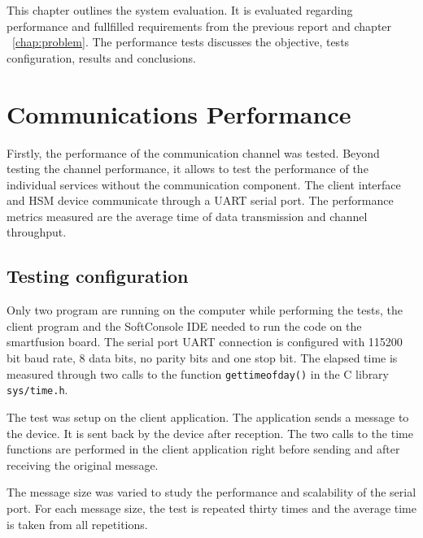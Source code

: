\cleardoublepage
\label{chap:evaluation}

This chapter outlines the system evaluation. It is evaluated regarding performance and fullfilled requirements from the previous report and chapter ~\ref{chap:problem}.
The performance tests discusses the objective, tests configuration, results and conclusions.
\section{Communications Performance}\label{chap:evaluation:comms}

Firstly, the performance of the communication channel was tested. Beyond testing the channel performance, it allows to test the performance of the individual services without the communication component. 
The client interface and HSM device communicate through a \ac{UART} serial port.
The performance metrics measured are the average time of data transmission and channel throughput.

\subsection{Testing configuration}\label{chap:evaluation:comms:config}

Only two program are running on the computer while performing the tests, the client program and the SoftConsole IDE needed to run the code on the smartfusion board.
The serial port UART connection is configured with 115200 bit baud rate, 8 data bits, no parity bits and one stop bit.
The elapsed time is measured through two calls to the function \texttt{gettimeofday()} in the C library \texttt{sys/time.h}.

The test was setup on the client application. The application sends a message to the device. It is sent back by the device after reception. The two calls to the time functions are performed in the client application right before sending and after receiving the original message.

The message size was varied to study the performance and scalability of the serial port. For each message size, the test is repeated thirty times and the average time is taken from all repetitions.

